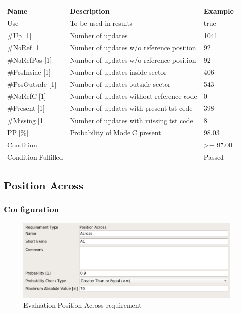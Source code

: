 \begin{center}
 \begin{table}[H]
  \begin{tabularx}{\textwidth}{ | l | X |  l | }
    \hline
    \textbf{Name} & \textbf{Description} & \textbf{Example} \\ \hline
    Use & To be used in results & true \\ \hline
    \#Up [1] & Number of updates & 1041 \\ \hline
    \#NoRef [1] & Number of updates w/o reference position & 92 \\ \hline
    \#NoRefPos [1] & Number of updates w/o reference position  & 92 \\ \hline
    \#PosInside [1] & Number of updates inside sector & 406 \\ \hline
    \#PosOutside [1] & Number of updates outside sector & 543 \\ \hline
    \#NoRefC [1] & Number of updates without reference code & 0 \\ \hline
    \#Present [1] & Number of updates with present tst code & 398 \\ \hline
    \#Missing [1] & Number of updates with missing tst code & 8 \\ \hline
    PP [\%] & Probability of Mode C present & 98.03 \\ \hline
    Condition &  & >= 97.00 \\ \hline
    Condition Fulfilled &  & Passed \\ \hline
\end{tabularx}
\end{table}
\end{center}

\subsection{Position Across}
\label{sec:eval_req_pos_across} 

\subsubsection{Configuration}

\begin{figure}[H]
    \includegraphics[width=14cm,frame]{../screenshots/eval_req_pos_across.png}
  \caption{Evaluation Position Across requirement}
\end{figure}

